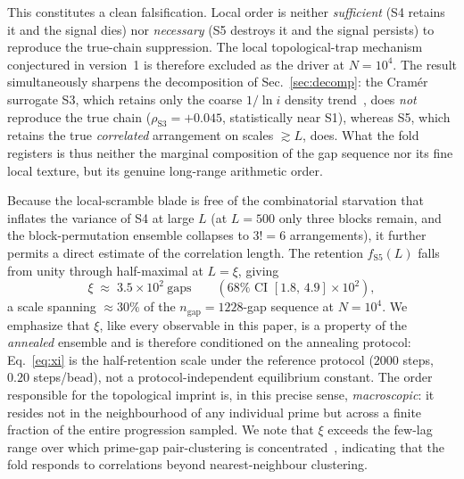\documentclass[11pt]{article}
\begin{document}
This constitutes a clean falsification. Local order is neither \emph{sufficient}
(S4 retains it and the signal dies) nor \emph{necessary} (S5 destroys it and the
signal persists) to reproduce the true-chain suppression. The local topological-trap
mechanism conjectured in version~1 is therefore excluded as the driver at $N=10^{4}$.
The result simultaneously sharpens the decomposition of Sec.~\ref{sec:decomp}: the
Cram\'er surrogate S3, which retains only the coarse $1/\ln i$ density
trend~\cite{Cramer}, does \emph{not} reproduce the true chain
($\rho_{\mathrm{S3}} = +0.045$, statistically near S1), whereas S5, which retains the
true \emph{correlated} arrangement on scales $\gtrsim L$, does. What the fold
registers is thus neither the marginal composition of the gap sequence nor its fine
local texture, but its genuine long-range arithmetic order.

Because the local-scramble blade is free of the combinatorial starvation that
inflates the variance of S4 at large $L$ (at $L=500$ only three blocks remain, and
the block-permutation ensemble collapses to $3! = 6$ arrangements), it further
permits a direct estimate of the correlation length. The retention
$f_{\mathrm{S5}}(L)$ falls from unity through half-maximal at $L = \xi$, giving
\begin{equation}
  \xi \;\approx\; 3.5 \times 10^{2}\ \text{gaps}
  \qquad (\text{$68\%$ CI } [1.8,\,4.9]\times10^{2}),
  \label{eq:xi}
\end{equation}
a scale spanning ${\approx}30\%$ of the $n_{\mathrm{gap}} = 1228$-gap sequence at
$N=10^{4}$. We emphasize that $\xi$, like every observable in this paper, is a
property of the \emph{annealed} ensemble and is therefore conditioned on the
annealing protocol: Eq.~\eqref{eq:xi} is the half-retention scale under the
reference protocol ($2000$ steps, $0.20$ steps/bead), not a protocol-independent
equilibrium constant. The order responsible for the topological imprint is, in this
precise sense, \emph{macroscopic}: it resides not in the neighbourhood of any
individual prime but across a finite fraction of the entire progression sampled. We
note that $\xi$ exceeds the few-lag range over which prime-gap pair-clustering is
concentrated~\cite{AresCastro}, indicating that the fold responds to correlations
beyond nearest-neighbour clustering.
\end{document}
